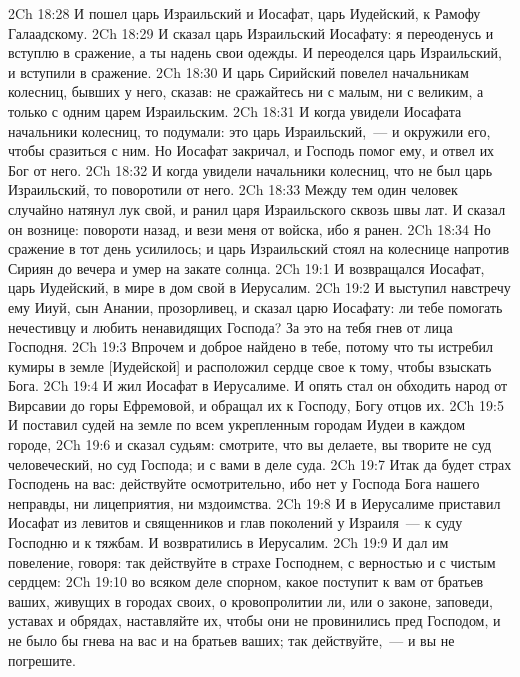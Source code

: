 \rsbpar\vs 2Ch 18:28 И пошел царь Израильский и Иосафат, царь Иудейский, к Рамофу Галаадскому.
\vs 2Ch 18:29 И сказал царь Израильский Иосафату: я переоденусь и вступлю в сражение, а ты надень свои  одежды. И переоделся царь Израильский, и вступили в сражение.
\vs 2Ch 18:30 И царь Сирийский повелел начальникам колесниц, бывших у него, сказав: не сражайтесь ни с малым, ни с великим, а только с одним царем Израильским.
\vs 2Ch 18:31 И когда увидели Иосафата начальники колесниц, то подумали: это царь Израильский,~--- и окружили его, чтобы сразиться с ним. Но Иосафат закричал, и Господь помог ему, и отвел их Бог от него.
\vs 2Ch 18:32 И когда увидели начальники колесниц, что  не был царь Израильский, то поворотили от него.
\vs 2Ch 18:33 Между тем один человек случайно натянул лук свой, и ранил царя Израильского сквозь швы лат. И сказал он вознице: повороти назад, и вези меня от войска, ибо я ранен.
\vs 2Ch 18:34 Но сражение в тот день усилилось; и царь Израильский стоял на колеснице напротив Сириян до вечера и умер на закате солнца.
\vs 2Ch 19:1 И возвращался Иосафат, царь Иудейский, в мире в дом свой в Иерусалим.
\vs 2Ch 19:2 И выступил навстречу ему Ииуй, сын Анании, прозорливец, и сказал царю Иосафату:  ли тебе помогать нечестивцу и любить ненавидящих Господа? За это на тебя гнев от лица Господня.
\vs 2Ch 19:3 Впрочем и доброе найдено в тебе, потому что ты истребил кумиры в земле [Иудейской] и расположил сердце свое к тому, чтобы взыскать Бога.
\rsbpar\vs 2Ch 19:4 И жил Иосафат в Иерусалиме. И опять стал он обходить народ  от Вирсавии до горы Ефремовой, и обращал их к Господу, Богу отцов их.
\vs 2Ch 19:5 И поставил судей на земле по всем укрепленным городам Иудеи в каждом городе,
\vs 2Ch 19:6 и сказал судьям: смотрите, что вы делаете, вы творите не суд человеческий, но суд Господа; и  с вами в деле суда.
\vs 2Ch 19:7 Итак да будет страх Господень на вас: действуйте осмотрительно, ибо нет у Господа Бога нашего неправды, ни лицеприятия, ни мздоимства.
\vs 2Ch 19:8 И в Иерусалиме приставил Иосафат  из левитов и священников и глав поколений у Израиля~--- к суду Господню и к тяжбам. И возвратились в Иерусалим.
\vs 2Ch 19:9 И дал им повеление, говоря: так действуйте в страхе Господнем, с верностью и с чистым сердцем:
\vs 2Ch 19:10 во всяком деле спорном, какое поступит к вам от братьев ваших, живущих в городах своих, о кровопролитии ли, или о законе, заповеди, уставах и обрядах, наставляйте их, чтобы они не провинились пред Господом, и не было бы гнева  на вас и на братьев ваших; так действуйте,~--- и вы не погрешите.
